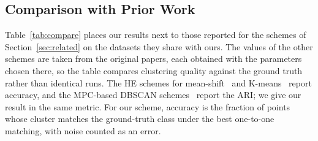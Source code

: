 \subsection{Comparison with Prior Work}
\label{sec:compare}

Table~\ref{tab:compare} places our results next to those reported for the
schemes of Section~\ref{sec:related} on the datasets they share with ours.
The values of the other schemes are taken from the original papers, each
obtained with the parameters chosen there, so the table compares clustering
quality against the ground truth rather than identical runs. The HE schemes
for mean-shift~\cite{cheon2019towards} and K-means~\cite{yang2024optimized}
report accuracy, and the MPC-based DBSCAN
schemes~\cite{bozdemir2021privacy,fu2024ppa} report the ARI; we give our
result in the same metric. For our scheme, accuracy is the fraction of
points whose cluster matches the ground-truth class under the best
one-to-one matching, with noise counted as an error.


